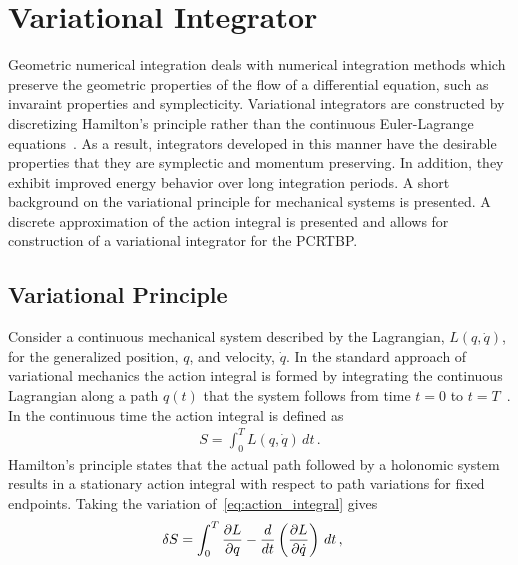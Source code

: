 \documentclass[preprint]{elsarticle}
\begin{document}
\section{Variational Integrator}\label{sec:discrete_var}
Geometric numerical integration deals with numerical integration methods which preserve the geometric properties of the flow of a differential equation, such as invaraint properties and symplecticity.
Variational integrators are constructed by discretizing Hamilton's principle rather than the continuous Euler-Lagrange equations~\cite{marsden2001}.
As a result, integrators developed in this manner have the desirable properties that they are symplectic and momentum preserving.
In addition, they exhibit improved energy behavior over long integration periods.
A short background on the variational principle for mechanical systems is presented. 
A discrete approximation of the action integral is presented and allows for construction of a variational integrator for the PCRTBP.

\subsection{Variational Principle}
Consider a continuous mechanical system described by the Lagrangian, \( L( q, \dot{q} ) \), for the generalized position, \( q\), and velocity, \( \dot{q} \).
In the standard approach of variational mechanics the action integral is formed by integrating the continuous Lagrangian along a path \( q(t) \) that the system follows from time \( t = 0 \) to \( t = T \)~\cite{greenwood1988}.
In the continuous time the action integral is defined as
\begin{align}\label{eq:action_integral}
	S = \int_{0}^T L\left( q, \dot{q}\right) \, dt \, .
\end{align}
Hamilton's principle states that the actual path followed by a holonomic system results in a stationary action integral with respect to path variations for fixed endpoints.
Taking the variation of~\cref{eq:action_integral} gives
\begin{align}\label{eq:var_principle}
	\delta S %
	&= \int_{0}^T \deriv{L}{q} - \frac{d}{dt} \left( \deriv{L}{\dot{q}}	\right) \, dt \, ,
\end{align}
\end{document}
